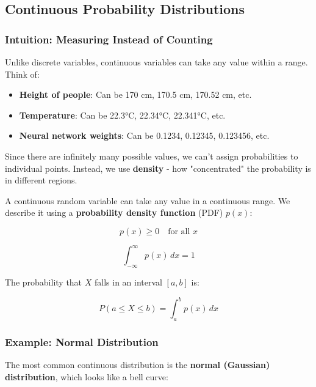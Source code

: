 \subsection{Continuous Probability Distributions}

\subsubsection{Intuition: Measuring Instead of Counting}

Unlike discrete variables, continuous variables can take any value within a range. Think of:
\begin{itemize}
    \item \textbf{Height of people}: Can be 170 cm, 170.5 cm, 170.52 cm, etc.
    \item \textbf{Temperature}: Can be 22.3°C, 22.34°C, 22.341°C, etc.
    \item \textbf{Neural network weights}: Can be 0.1234, 0.12345, 0.123456, etc.
\end{itemize}

Since there are infinitely many possible values, we can't assign probabilities to individual points. Instead, we use \textbf{density} - how "concentrated" the probability is in different regions.

A continuous random variable can take any value in a continuous range. We describe it using a \textbf{probability density function} (PDF) $p(x)$:

\begin{equation}
p(x) \geq 0 \quad \text{for all } x
\end{equation}

\begin{equation}
\int_{-\infty}^{\infty} p(x) \, dx = 1
\end{equation}

The probability that $X$ falls in an interval $[a, b]$ is:

\begin{equation}
P(a \leq X \leq b) = \int_a^b p(x) \, dx
\end{equation}

\subsubsection{Example: Normal Distribution}

The most common continuous distribution is the \textbf{normal (Gaussian) distribution}, which looks like a bell curve:

